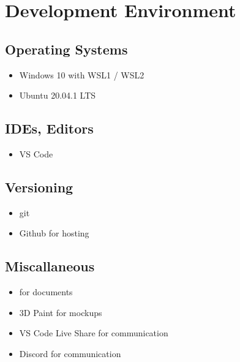 \section{Development Environment}
\subsection{Operating Systems}
\begin{itemize}
    \item Windows 10 with WSL1 / WSL2
    \item Ubuntu 20.04.1 LTS
\end{itemize}
\subsection{IDEs, Editors}
\begin{itemize}
    \item VS Code
\end{itemize}
\subsection{Versioning}
\begin{itemize}
    \item git
    \item Github for hosting
\end{itemize}
\subsection{Miscallaneous}
\begin{itemize}
    \item {} for documents
    \item 3D Paint for mockups %
    \item VS Code Live Share for communication
    \item Discord for communication
\end{itemize}